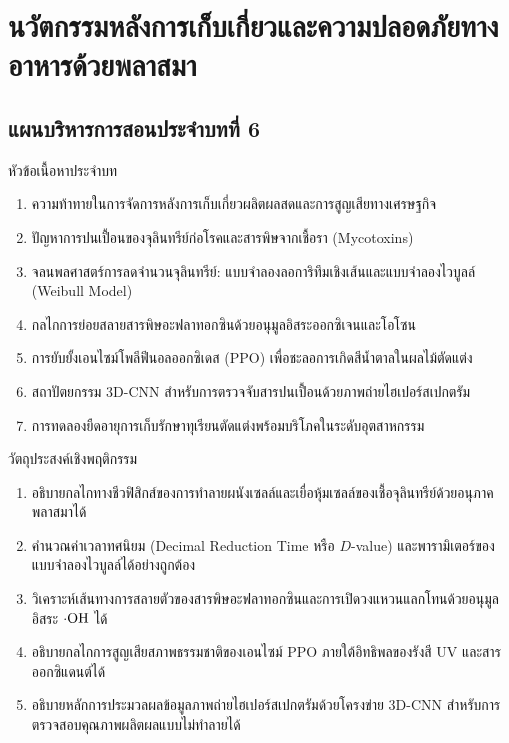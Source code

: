 \chapter{นวัตกรรมหลังการเก็บเกี่ยวและความปลอดภัยทางอาหารด้วยพลาสมา}
\label{chap:ch06}


\vspace*{-6pt}
\section*{แผนบริหารการสอนประจำบทที่ 6}

\begin{planbox}{หัวข้อเนื้อหาประจำบท}
\begin{enumerate}
    \item ความท้าทายในการจัดการหลังการเก็บเกี่ยวผลิตผลสดและการสูญเสียทางเศรษฐกิจ
    \item ปัญหาการปนเปื้อนของจุลินทรีย์ก่อโรคและสารพิษจากเชื้อรา (Mycotoxins)
    \item จลนพลศาสตร์การลดจำนวนจุลินทรีย์: แบบจำลองลอการิทึมเชิงเส้นและแบบจำลองไวบูลล์ (Weibull Model)
    \item กลไกการย่อยสลายสารพิษอะฟลาทอกซินด้วยอนุมูลอิสระออกซิเจนและโอโซน
    \item การยับยั้งเอนไซม์โพลีฟีนอลออกซิเดส (PPO) เพื่อชะลอการเกิดสีน้ำตาลในผลไม้ตัดแต่ง
    \item สถาปัตยกรรม 3D-CNN สำหรับการตรวจจับสารปนเปื้อนด้วยภาพถ่ายไฮเปอร์สเปกตรัม
    \item การทดลองยืดอายุการเก็บรักษาทุเรียนตัดแต่งพร้อมบริโภคในระดับอุตสาหกรรม
\end{enumerate}
\end{planbox}

\begin{planbox}{วัตถุประสงค์เชิงพฤติกรรม}
\begin{enumerate}
    \item อธิบายกลไกทางชีวฟิสิกส์ของการทำลายผนังเซลล์และเยื่อหุ้มเซลล์ของเชื้อจุลินทรีย์ด้วยอนุภาคพลาสมาได้
    \item คำนวณค่าเวลาทศนิยม (Decimal Reduction Time หรือ $D$-value) และพารามิเตอร์ของแบบจำลองไวบูลล์ได้อย่างถูกต้อง
    \item วิเคราะห์เส้นทางการสลายตัวของสารพิษอะฟลาทอกซินและการเปิดวงแหวนแลกโทนด้วยอนุมูลอิสระ $\cdot\ce{OH}$ ได้
    \item อธิบายกลไกการสูญเสียสภาพธรรมชาติของเอนไซม์ PPO ภายใต้อิทธิพลของรังสี UV และสารออกซิแดนต์ได้
    \item อธิบายหลักการประมวลผลข้อมูลภาพถ่ายไฮเปอร์สเปกตรัมด้วยโครงข่าย 3D-CNN สำหรับการตรวจสอบคุณภาพผลิตผลแบบไม่ทำลายได้
\end{enumerate}
\end{planbox}

